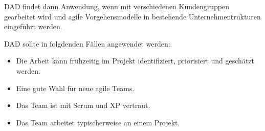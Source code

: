 DAD findet dann Anwendung, wenn mit verschiedenen Kundengruppen gearbeitet wird und agile Vorgehensmodelle in bestehende Unternehmentrukturen eingeführt werden.

DAD sollte in folgdenden Fällen angewendet werden:

\begin{itemize}
	\item Die Arbeit kann frühzeitig im Projekt identifiziert, priorisiert und geschätzt werden.
	\item Eine gute Wahl für neue agile Teams.
	\item Das Team ist mit Scrum und XP vertraut.
	\item Das Team arbeitet typischerweise an einem Projekt.
\end{itemize}

